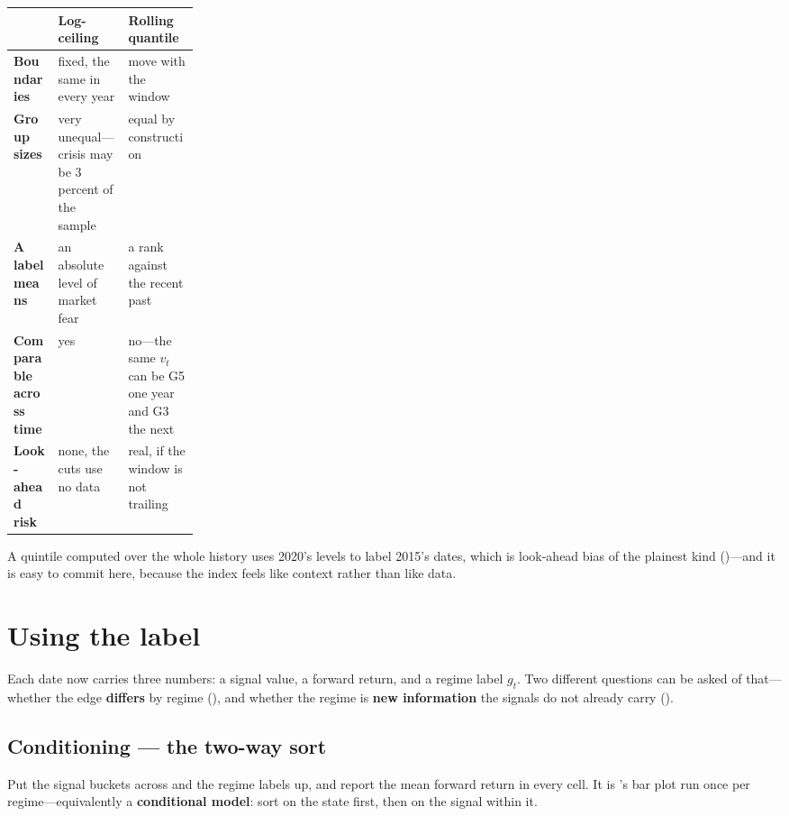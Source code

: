 \begin{tabularx}{\linewidth}{|>{\raggedright\arraybackslash}p{0.24\linewidth}|X|X|}
\hline
 & \textbf{Log-ceiling} & \textbf{Rolling quantile} \\ \hline
\textbf{Boundaries}            & fixed, the same in every year
                               & move with the window \\ \hline
\textbf{Group sizes}           & very unequal---crisis may be 3 percent of the sample
                               & equal by construction \\ \hline
\textbf{A label means}         & an absolute level of market fear
                               & a rank against the recent past \\ \hline
\textbf{Comparable across time} & yes
                               & no---the same $v_t$ can be G5 one year and G3 the next \\ \hline
\textbf{Look-ahead risk}       & none, the cuts use no data
                               & real, if the window is not trailing \\ \hline
\end{tabularx}

\begin{note}
A quintile computed over the whole history uses 2020's levels to label 2015's dates, which is
look-ahead bias of the plainest kind ()---and it is easy to
commit here, because the index feels like context rather than like data.
\end{note}


\section{Using the label}\label{sec:using-label}

Each date now carries three numbers: a signal value, a forward return, and a regime label $g_t$. Two
different questions can be asked of that---whether the edge \textbf{differs} by regime
(), and whether the regime is \textbf{new information} the signals do not
already carry ().

\subsection{Conditioning --- the two-way sort}\label{sec:conditioning}

Put the signal buckets across and the regime labels up, and report the mean forward return in every
cell. It is 's bar plot run once per regime---equivalently a
\textbf{conditional model}: sort on the state first, then on the signal within it.

